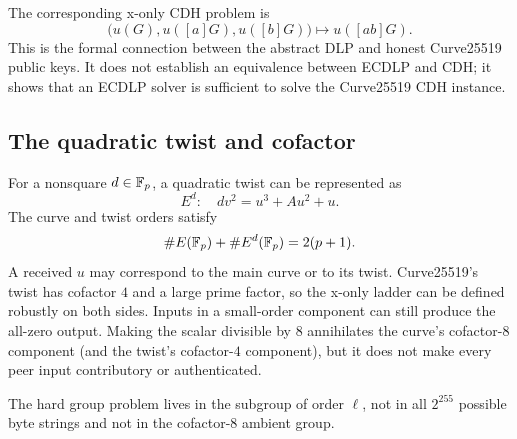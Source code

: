 The corresponding x-only CDH problem is
\[
  \bigl(u(G),u([a]G),u([b]G)\bigr)
  \longmapsto u([ab]G).
\]
This is the formal connection between the abstract DLP and honest Curve25519
public keys. It does not establish an equivalence between ECDLP and CDH; it
shows that an ECDLP solver is sufficient to solve the Curve25519 CDH instance.

\subsection{The quadratic twist and cofactor}

For a nonsquare $d\in\mathbb{F}_p$, a quadratic twist can be represented as
\[
  E^d:\quad d v^2=u^3+Au^2+u.
\]
The curve and twist orders satisfy
\[
  \#E(\mathbb{F}_p)+\#E^d(\mathbb{F}_p)=2(p+1).
\]
A received $u$ may correspond to the main curve or to its twist. Curve25519's
twist has cofactor $4$ and a large prime factor, so the x-only ladder can be
defined robustly on both sides. Inputs in a small-order component can still
produce the all-zero output. Making the scalar divisible by $8$ annihilates
the curve's cofactor-$8$ component (and the twist's cofactor-$4$ component),
but it does not make every peer input contributory or authenticated.

\begin{takeaway}
The hard group problem lives in the subgroup of order $\ell$, not in all
$2^{255}$ possible byte strings and not in the cofactor-$8$ ambient group.
\end{takeaway}
